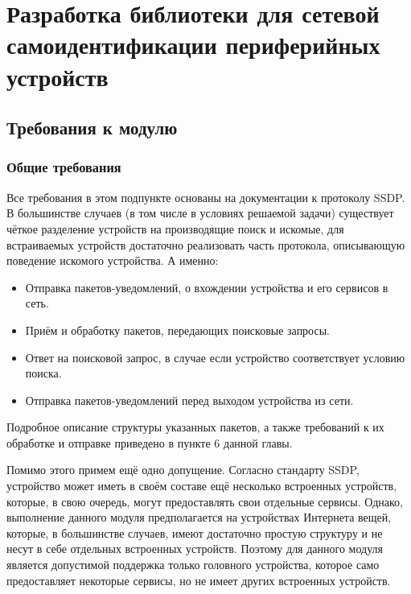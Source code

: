 \chapter{Разработка библиотеки для сетевой самоидентификации периферийных устройств}

\section{Требования к модулю}
	
\subsection{Общие требования}

Все требования в этом подпункте основаны на документации к протоколу SSDP\cite{web:upnp}.
В большинстве случаев (в том числе в условиях решаемой задачи) существует чёткое разделение устройств на производящие поиск и искомые, для встраиваемых устройств достаточно реализовать часть протокола, описывающую поведение искомого устройства.
А именно:
\begin{itemize}
	\item Отправка пакетов-уведомлений, о вхождении устройства и его сервисов в сеть.
	\item Приём и обработку пакетов, передающих поисковые запросы.
	\item Ответ на поисковой запрос, в случае если устройство соответствует условию поиска.
	\item Отправка пакетов-уведомлений перед выходом устройства из сети.
\end{itemize}
Подробное описание структуры указанных пакетов, а также требований к их обработке и отправке приведено в пункте 6 данной главы.

Помимо этого примем ещё одно допущение.
Согласно стандарту SSDP, устройство может иметь в своём составе ещё несколько встроенных устройств, которые, в свою очередь, могут предоставлять свои отдельные сервисы.
Однако, выполнение данного модуля предполагается на устройствах Интернета вещей, которые, в большинстве случаев, имеют достаточно простую структуру и не несут в себе отдельных встроенных устройств.
Поэтому для данного модуля является допустимой поддержка только головного устройства, которое само предоставляет некоторые сервисы, но не имеет других встроенных устройств.


